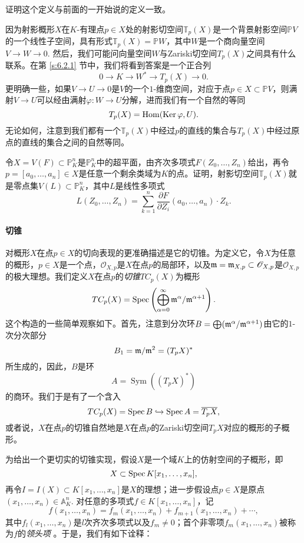 \begin{exe}\label{exe:3.27}
	证明这个定义与前面的一开始说的\naive 定义一致。
\end{exe}

因为射影概形$X$在$K$-有理点$p\in X$处的射影切空间$\mathbb T_p(X)$是一个背景射影空间$\mathbb PV$的一个线性子空间，具有形式$\mathbb T_p(X)=\mathbb PW$，其中$W$是一个商向量空间$V\to W\to 0$. 然后，我们可能问向量空间$W$与Zariski切空间$T_p(X)$之间具有什么联系。在第 \ref{s:6.2.1} 节中，我们将看到答案是一个正合列
\[
	0\longrightarrow K\longrightarrow W^* \longrightarrow T_p(X)\longrightarrow 0.
\]
更明确一些，如果$V\to U\to 0$是$V$的一个$1$-维商空间，对应于点$p\in X\subset \mathbb PV$，则满射$V\to U$可以经由满射$\varphi:W\to U$分解，进而我们有一个自然的等同
\[
	T_p(X)=\operatorname{Hom}(\operatorname{Ker}\varphi,U).
\]
无论如何，注意到我们都有一个$\mathbb T_p(X)$中经过$p$的直线的集合与$T_p(X)$中经过原点的直线的集合之间的自然等同。

\begin{exe}\label{exe:3.28}
	令$X=V(F)\subset \mathbb P_K^n$是$\mathbb P_K^n$中的超平面，由齐次多项式$F(Z_0,\dots,Z_n)$给出，再令$p=[a_0,\dots,a_n]\in X$是任意一个剩余类域为$K$的点。证明，射影切空间$\mathbb T_p(X)$就是零点集$V(L)\subset \mathbb P_K^n$，其中$L$是线性多项式
	\[
		L(Z_0,\dots,Z_n)=\sum_{k=1}^n\frac{\partial F}{\partial Z_i}(a_0,\dots,a_n)\cdot Z_k.
	\]
\end{exe}

\paragraph*{切锥}
对概形$X$在点$p\in X$的切向表现的更准确描述是它的切锥。为定义它，令$X$为任意的概形，$p\in X$是一个点，$\mathscr O_{X,p}$是$X$在点$p$的局部环，以及$\mathfrak{m}=\mathfrak{m}_{X,p}\subset \mathscr O_{X,p}$是$\mathscr O_{X,p}$的极大理想。我们定义$X$在点$p$的\textit{切锥}$TC_p(X)$为概形
\[
	TC_p(X)=\operatorname{Spec} \left(\bigoplus_{\alpha=0}^\infty \mathfrak{m}^\alpha/\mathfrak{m}^{\alpha+1}\right).
\]
这个构造的一些简单观察如下。首先，注意到分次环$B=\bigoplus (\mathfrak{m}^\alpha/\mathfrak{m}^{\alpha+1})$由它的$1$-次分次部分
\[
	B_1=\mathfrak{m}/\mathfrak{m}^2=(T_pX)^*
\]
所生成的，因此，$B$是环
\[
	A=\operatorname{Sym}((T_pX)^*)
\]
的商环。我们于是有了一个含入
\[
	TC_p(X)=\operatorname{Spec} B\hookrightarrow \operatorname{Spec} A=\overline{T_pX},
\]
或者说，$X$在点$p$的切锥自然地是$X$在点$p$的Zariski切空间$T_pX$对应的概形的子概形。

为给出一个更切实的切锥实现，假设$X$是一个域$K$上的仿射空间的子概形，即
\[
	X\subset \operatorname{Spec} K[x_1,\dots,x_n],
\]
再令$I=I(X)\subset K[x_1,\dots,x_n]$是$X$的理想；进一步假设点$p\in X$是原点$(x_1,\dots,x_n)\in \mathbb A_K^n$. 对任意的多项式$f\in K[x_1,\dots,x_n]$，记
\[
	f(x_1,\dots,x_n)=f_m(x_1,\dots,x_n)+f_{m+1}(x_1,\dots,x_n)+\cdots,
\]
其中$f_l(x_1,\dots,x_n)$是$l$次齐次多项式以及$f_m\neq 0$；首个非零项$f_m(x_1,\dots,x_n)$被称为$f$的\textit{领头项}%
。于是，我们有如下诠释：

